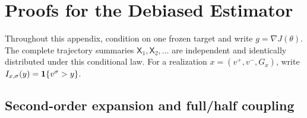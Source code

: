 \section{Proofs for the Debiased Estimator}\label{app:estimator}

Throughout this appendix, condition on one frozen target and write
$g=\nabla J(\theta)$.  The complete trajectory summaries $\mathsf X_1,\mathsf X_2,\ldots$ are independent and identically distributed under this conditional law.
For a realization $x=(v^+,v^-,G_x)$, write $I_{x,\sigma}(y)=\mathbf 1\{v^\sigma>y\}$.

\subsection{Second-order expansion and full/half coupling}

